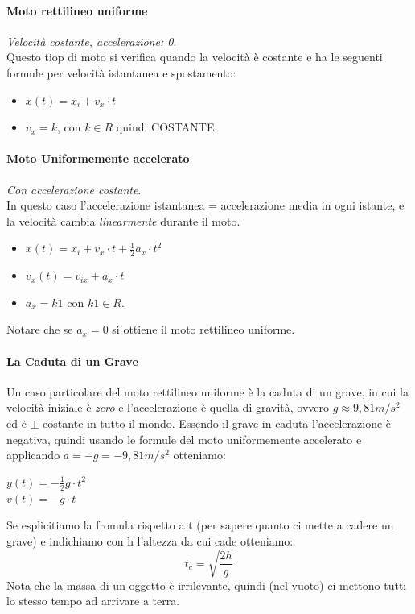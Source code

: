 \documentclass[12pt, a4paper, openany]{book}
\begin{document}
\paragraph*{Moto rettilineo uniforme}\emph{Velocità costante, accelerazione: 0}.
\\Questo tiop di moto si verifica quando la velocità è costante e ha le seguenti formule per velocità istantanea e spostamento:
\begin{itemize}
    \item $x(t)= x_i + v_x \cdot t$
    \item $v_x = k$, con $k\in R$ quindi COSTANTE.
\end{itemize}
\paragraph*{Moto Uniformemente accelerato} \emph{Con accelerazione costante}.
\\In questo caso l'accelerazione istantanea = accelerazione media in ogni istante, e la velocità cambia \emph{linearmente} durante il moto.
\begin{itemize}
    \item $x(t) = x_i + v_x\cdot t +\frac{1}{2} a_x \cdot t^2$
    \item $v_x(t) = v_{ix} + a_x \cdot t$
    \item $a_x = k1$ con $k1 \in R$.
\end{itemize}
Notare che se $a_x=0$ si ottiene il moto rettilineo uniforme.

\paragraph*{La Caduta di un Grave}
Un caso particolare del moto rettilineo uniforme è la caduta di un grave, in cui la velocità iniziale è \emph{zero} e
l'accelerazione è quella di gravità, ovvero $g\approx 9,81m/s^2$ ed è $\pm$ costante in tutto il mondo.
Essendo il grave in caduta l'accelerazione è negativa, quindi usando le formule del moto uniformemente accelerato e applicando $a=-g=-9,81m/s^2$ otteniamo:
\begin{center} %
    $y(t)=-\frac{1}{2} g\cdot t^2$\\$ v(t) = -g \cdot t$
\end{center}
Se esplicitiamo la fromula rispetto a t (per sapere quanto ci mette a cadere un grave) e indichiamo con h l'altezza da cui cade otteniamo:
$$t_c =\sqrt{\frac{2h}{g}}$$
Nota che la massa di un oggetto è irrilevante, quindi (nel vuoto) ci mettono tutti lo stesso tempo ad arrivare a terra.
\end{document}
